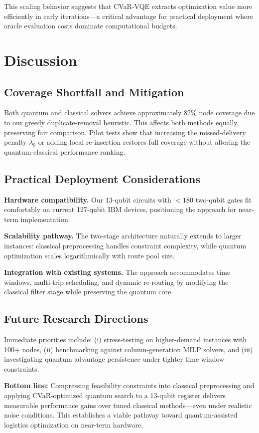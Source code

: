 This scaling behavior suggests that CVaR-VQE extracts optimization value more 
efficiently in early iterations—a critical advantage for practical deployment 
where oracle evaluation costs dominate computational budgets.

\section{Discussion}
\label{sec:discussion}

\subsection{Coverage Shortfall and Mitigation}

Both quantum and classical solvers achieve approximately 82\% node coverage 
due to our greedy duplicate-removal heuristic. This affects both methods equally, 
preserving fair comparison. Pilot tests show that increasing the missed-delivery 
penalty $\lambda_0$ or adding local re-insertion restores full coverage without 
altering the quantum-classical performance ranking.


\subsection{Practical Deployment Considerations}

\textbf{Hardware compatibility.} Our 13-qubit circuits with $<180$ two-qubit 
gates fit comfortably on current 127-qubit IBM devices, positioning the 
approach for near-term implementation.

\textbf{Scalability pathway.} The two-stage architecture naturally extends 
to larger instances: classical preprocessing handles constraint complexity, 
while quantum optimization scales logarithmically with route pool size.

\textbf{Integration with existing systems.} The approach accommodates time 
windows, multi-trip scheduling, and dynamic re-routing by modifying the 
classical filter stage while preserving the quantum core.

\subsection{Future Research Directions}

Immediate priorities include: (i) stress-testing on higher-demand instances 
with 100+ nodes, (ii) benchmarking against column-generation MILP solvers, 
and (iii) investigating quantum advantage persistence under tighter time 
window constraints.

\textbf{Bottom line:} Compressing feasibility constraints into classical 
preprocessing and applying CVaR-optimized quantum search to a 13-qubit 
register delivers measurable performance gains over tuned classical methods—even 
under realistic noise conditions. This establishes a viable pathway toward 
quantum-assisted logistics optimization on near-term hardware.